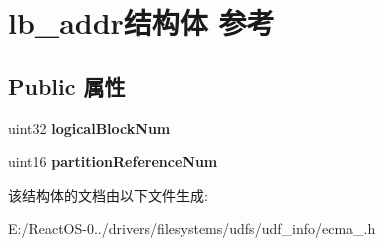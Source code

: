 \hypertarget{structlb__addr}{}\section{lb\+\_\+addr结构体 参考}
\label{structlb__addr}
\subsection*{Public 属性}
\begin{DoxyCompactItemize}
\item 
\mbox{\label{structlb__addr_ae4fbe5e7841665707ba7794a6d80366e}} 
uint32 {\bfseries logical\+Block\+Num}
\item 
\mbox{\label{structlb__addr_a7e1a91fdc270a743e2936ade9d492842}} 
uint16 {\bfseries partition\+Reference\+Num}
\end{DoxyCompactItemize}


该结构体的文档由以下文件生成\+:\begin{DoxyCompactItemize}
\item 
E\+:/\+React\+O\+S-\/0../drivers/filesystems/udfs/udf\+\_\+info/ecma\+\_.\+h\end{DoxyCompactItemize}
